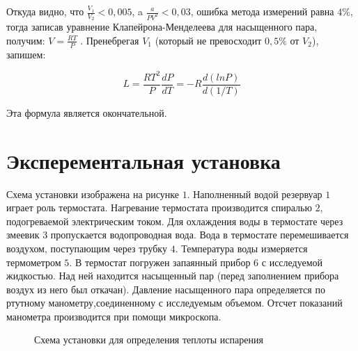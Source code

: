\documentclass[a4paper, 12pt]{article} %
\begin{document}
Откуда видно, что $\frac{V_1}{V_2} < 0,005$, a $\frac{a}{PV^2}<0,03$, ошибка метода измерений равна $4\%$, тогда записав уравнение Клапейрона-Менделеева для насыщенного пара, получим:
$V=\frac{RT}{P}\;.$
Пренебрегая $V_1$ (который не превосходит $0,5\%$ от $V_2$), запишем:

\begin{equation}
    L=\frac{RT^2}{P} \frac{dP}{dT} = -R\frac{d(lnP)}{d(1/T)}
\end{equation}

Эта формула является окончательной.

\section{Эксперементальная установка}

Схема установки изображена на рисунке $1$. Наполненный водой резервуар $1$ играет роль термостата. Нагревание термостата производится спиралью $2$, подогреваемой электрическим током. Для охлаждения воды в термостате через змеевик $3$ пропускается водопроводная вода. Вода в термостате перемешивается воздухом,
поступающим через трубку $4$. Температура воды измеряется термометром $5$. В термостат погружен запаянный прибор $6$ с исследуемой жидкостью. Над ней находится насыщенный пар (перед заполнением прибора воздух из него был откачан).
Давление насыщенного пара определяется по ртутному манометру,соединенному с исследуемым объемом. Отсчет показаний манометра производится при помощи микроскопа.

\begin{figure}[h]
    \caption{Схема установки для определения теплоты испарения}
\end{figure}
\end{document}
